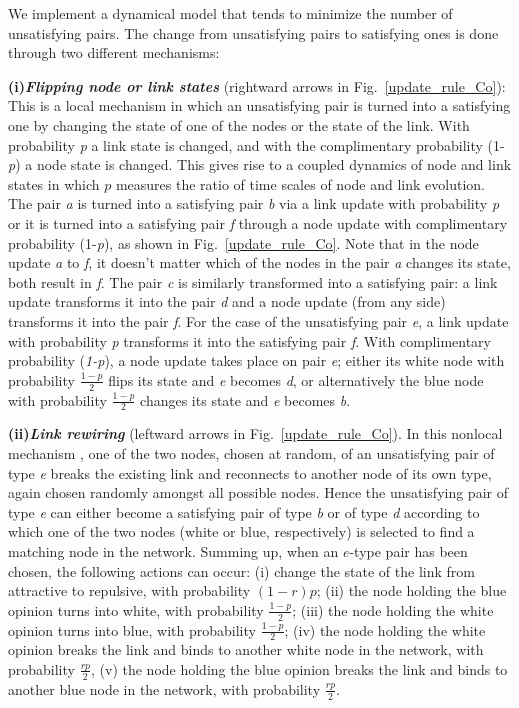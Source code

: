 \documentclass[aps,pre,notitlepage]{revtex4-1}
\begin{document}
We implement a dynamical model that tends to minimize the number of unsatisfying pairs. The change from unsatisfying pairs to satisfying ones is done through two different mechanisms:

\textbf{(i)}\textbf{\textit{Flipping node or link states}} (rightward arrows in Fig.~\ref{update_rule_Co}): This is a local mechanism in which an unsatisfying pair is turned into a satisfying one by changing the state of one of the nodes or the state of the link. With probability \textit{p} a link state is changed, and with the complimentary probability (1-\textit{p}) a node state is changed. This gives rise to a coupled dynamics of node and link states in which $p$ measures the ratio of time scales of node and link evolution. The pair \textit{a} is turned into a satisfying pair \textit{b} via a link update with probability \textit{p} or it is turned into a satisfying pair \textit{f} through a node update with complimentary probability (1-\textit{p}), as shown in Fig.~\ref{update_rule_Co}. Note that in the node update \textit{a} to \textit{f}, it doesn't matter which of the nodes in the pair \textit{a} changes its state, both result in \textit{f}. The pair \textit{c} is similarly transformed into a satisfying pair: a link update transforms it into the pair \textit{d} and a node update (from any side) transforms it into the pair \textit{f}. For the case of the unsatisfying pair \textit{e}, a link update with probability \textit{p} transforms it into the satisfying pair \textit{f}. With complimentary probability (\textit{1-p}), a node update takes place on pair \textit{e}; either its white node with probability $\frac{1-p}{2}$ flips its state and \textit{e} becomes \textit{d}, or alternatively the blue node with probability $\frac{1-p}{2}$ changes its state and \textit{e} becomes \textit{b}.

\textbf{(ii)}\textbf{\textit{Link rewiring}} (leftward arrows in Fig.~\ref{update_rule_Co}). In this nonlocal mechanism \cite{vazquez2008generic}, one of the two nodes, chosen at random, of an unsatisfying pair of type \textit{e} breaks the existing link and reconnects to another node of its own type, again chosen randomly amongst all possible nodes. Hence the unsatisfying pair of type \textit{e} can either become a satisfying pair of type \textit{b} or of type \textit{d} according to which one of the two nodes (white or blue, respectively) is selected to find a matching node in the network. Summing up, when an $e$-type pair has been chosen, the following actions can occur: (i) change the state of the link from attractive to repulsive, with probability $(1-r)p$; (ii) the node holding the blue opinion turns into white, with probability $\frac{1-p}{2}$; (iii) the node holding the white opinion turns into blue, with probability $\frac{1-p}{2}$; (iv) the node holding the white opinion breaks the link and binds to another white node in the network, with probability $\frac{rp}{2}$, (v) the node holding the blue opinion breaks the link and binds to another blue node in the network, with probability $\frac{rp}{2}$.
\end{document}

